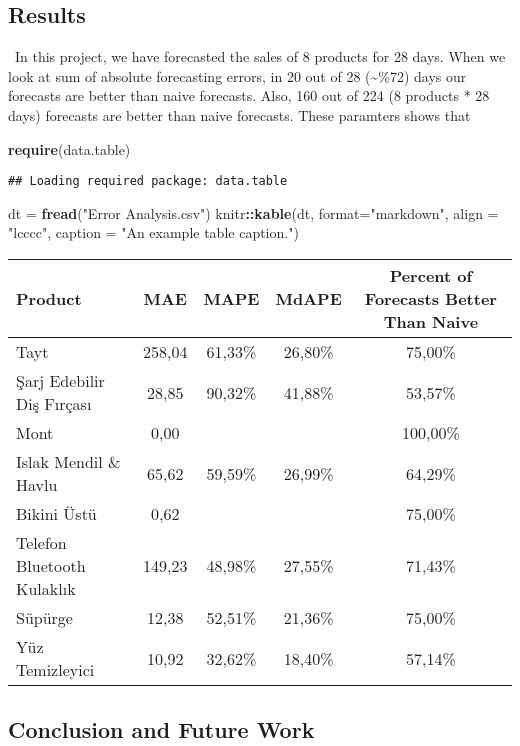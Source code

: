 \documentclass[]{article}
\newenvironment{Shaded}{\begin{snugshade}}{\end{snugshade}}
\newcommand{\DataTypeTok}[1]{\textcolor[rgb]{0.13,0.29,0.53}{#1}}
\newcommand{\KeywordTok}[1]{\textcolor[rgb]{0.13,0.29,0.53}{\textbf{#1}}}
\newcommand{\NormalTok}[1]{#1}
\newcommand{\OperatorTok}[1]{\textcolor[rgb]{0.81,0.36,0.00}{\textbf{#1}}}
\newcommand{\StringTok}[1]{\textcolor[rgb]{0.31,0.60,0.02}{#1}}
\begin{document}
\hypertarget{results}{%
\subsection{Results}\label{results}}

~In this project, we have forecasted the sales of 8 products for 28
days. When we look at sum of absolute forecasting errors, in 20 out of
28 (\textasciitilde\%72) days our forecasts are better than naive
forecasts. Also, 160 out of 224 (8 products * 28 days) forecasts are
better than naive forecasts. These paramters shows that

\begin{Shaded}
\begin{Highlighting}[]
\KeywordTok{require}\NormalTok{(data.table)}
\end{Highlighting}
\end{Shaded}

\begin{verbatim}
## Loading required package: data.table
\end{verbatim}

\begin{Shaded}
\begin{Highlighting}[]
\NormalTok{dt =}\StringTok{ }\KeywordTok{fread}\NormalTok{(}\StringTok{"Error Analysis.csv"}\NormalTok{)}
\NormalTok{knitr}\OperatorTok{::}\KeywordTok{kable}\NormalTok{(dt, }\DataTypeTok{format=}\StringTok{"markdown"}\NormalTok{, }\DataTypeTok{align =} \StringTok{"lcccc"}\NormalTok{, }\DataTypeTok{caption =} \StringTok{"An example table caption."}\NormalTok{)}
\end{Highlighting}
\end{Shaded}

\begin{longtable}[]{@{}lcccc@{}}
\toprule
Product & MAE & MAPE & MdAPE & Percent of Forecasts Better Than
Naive\tabularnewline
\midrule
\endhead
Tayt & 258,04 & 61,33\% & 26,80\% & 75,00\%\tabularnewline
Şarj Edebilir Diş Fırçası & 28,85 & 90,32\% & 41,88\% &
53,57\%\tabularnewline
Mont & 0,00 & & & 100,00\%\tabularnewline
Islak Mendil \& Havlu & 65,62 & 59,59\% & 26,99\% &
64,29\%\tabularnewline
Bikini Üstü & 0,62 & & & 75,00\%\tabularnewline
Telefon Bluetooth Kulaklık & 149,23 & 48,98\% & 27,55\% &
71,43\%\tabularnewline
Süpürge & 12,38 & 52,51\% & 21,36\% & 75,00\%\tabularnewline
Yüz Temizleyici & 10,92 & 32,62\% & 18,40\% & 57,14\%\tabularnewline
\bottomrule
\end{longtable}

\hypertarget{conclusion-and-future-work}{%
\subsection{Conclusion and Future
Work}\label{conclusion-and-future-work}}
\end{document}
